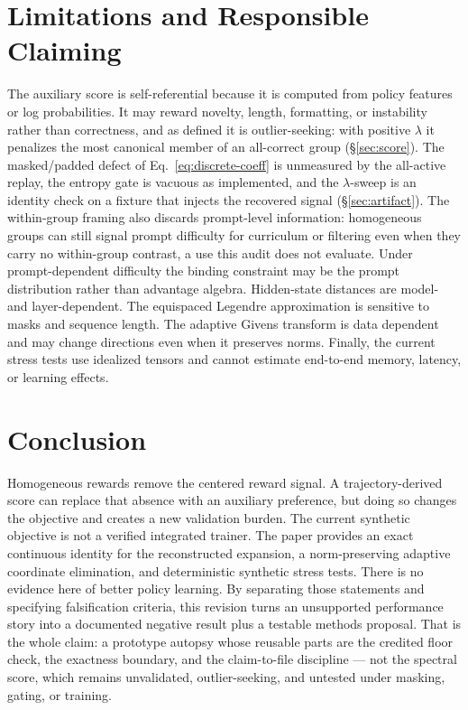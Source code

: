 \documentclass{article}
\begin{document}
\section{Limitations and Responsible Claiming}

The auxiliary score is self-referential because it is computed from policy
features or log probabilities.  It may reward novelty, length, formatting, or
instability rather than correctness, and as defined it is outlier-seeking:
with positive $\lambda$ it penalizes the most canonical member of an
all-correct group (\S\ref{sec:score}). The masked/padded defect of
Eq.~\eqref{eq:discrete-coeff} is unmeasured by the all-active replay, the
entropy gate is vacuous as implemented, and the $\lambda$-sweep is an
identity check on a fixture that injects the recovered signal (\S\ref{sec:artifact}).
The within-group framing also discards prompt-level information:
homogeneous groups can still signal prompt difficulty for curriculum or
filtering even when they carry no within-group contrast, a use this audit
does not evaluate. Under prompt-dependent difficulty the binding
constraint may be the prompt distribution rather than advantage algebra.  Hidden-state distances are model- and
layer-dependent.  The equispaced Legendre approximation is sensitive to masks
and sequence length.  The adaptive Givens transform is data dependent and may
change directions even when it preserves norms.  Finally, the current stress
tests use idealized tensors and cannot estimate end-to-end memory, latency, or
learning effects.

\section{Conclusion}

Homogeneous rewards remove the centered reward signal.  A trajectory-derived
score can replace that absence with an auxiliary preference, but doing so
changes the objective and creates a new validation burden. The current
synthetic objective is not a verified integrated trainer. The paper provides
an exact continuous identity for the
reconstructed expansion, a norm-preserving adaptive coordinate elimination,
and deterministic synthetic stress tests. There is no evidence here of
better policy learning.  By separating those statements and specifying
falsification criteria, this revision turns an unsupported performance story
into a documented negative result plus a testable methods proposal. That
is the whole claim: a prototype autopsy whose reusable parts are the credited floor
check, the exactness boundary, and the claim-to-file discipline --- not
the spectral score, which remains unvalidated, outlier-seeking, and
untested under masking, gating, or training.
\end{document}
